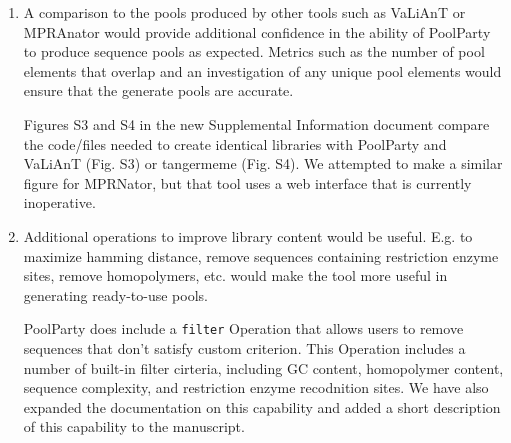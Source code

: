 \documentclass[11pt]{article}
\newenvironment{response}{\par\color{responseblue}}{\par}
\newenvironment{msquote}
  {\begin{quote}\color{responseblue}\itshape\noindent\ignorespaces}
  {\end{quote}}
\begin{document}
\begin{enumerate}

\item A comparison to the pools produced by other tools such as VaLiAnT or
MPRAnator would provide additional confidence in the ability of PoolParty to
produce sequence pools as expected. Metrics such as the number of pool elements that overlap and an investigation of any unique pool elements would ensure that the generate pools are accurate.

\begin{response}
Figures S3 and S4 in the new Supplemental Information document compare the code/files needed to create identical libraries with PoolParty and VaLiAnT (Fig. S3) or tangermeme (Fig. S4). We attempted to make a similar figure for MPRNator, but that tool uses a web interface that is currently inoperative. 
\end{response}

\item Additional operations to improve library content would be useful. E.g. to maximize hamming distance, remove sequences containing restriction enzyme sites, remove homopolymers, etc. would make the tool more useful in generating ready-to-use pools.

\begin{response}
PoolParty does include a \texttt{filter} Operation that allows users to remove sequences that don't satisfy custom criterion. This Operation includes a number of built-in filter cirteria, including GC content, homopolymer content, sequence complexity, and restriction enzyme recodnition sites. We have also expanded the documentation on this capability and added a short description of this capability to the manuscript. 


\end{response}
\end{enumerate}
\end{document}

